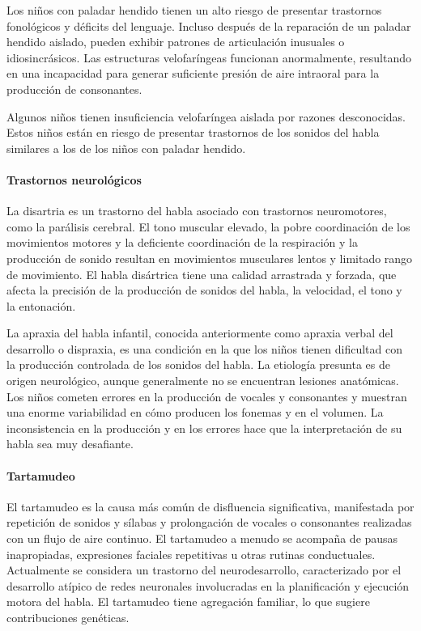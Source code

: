 \documentclass[11pt,letterpaper]{report}
\begin{document}
Los niños con paladar hendido tienen un alto riesgo de presentar trastornos
fonológicos y déficits del lenguaje. Incluso después de la reparación de un
paladar hendido aislado, pueden exhibir patrones de articulación inusuales o
idiosincrásicos. Las estructuras velofaríngeas funcionan anormalmente,
resultando en una incapacidad para generar suficiente presión de aire
intraoral para la producción de consonantes. \cite{Feldman44}

Algunos niños tienen insuficiencia velofaríngea aislada por razones
desconocidas. Estos niños están en riesgo de presentar trastornos de los
sonidos del habla similares a los de los niños con paladar hendido.
\cite{Feldman44}

\paragraph{Trastornos neurológicos}
La disartria es un trastorno del habla asociado con trastornos neuromotores,
como la parálisis cerebral. El tono muscular elevado, la pobre coordinación de
los movimientos motores y la deficiente coordinación de la respiración y la
producción de sonido resultan en movimientos musculares lentos y limitado rango
de movimiento. El habla disártrica tiene una calidad arrastrada y forzada, que
afecta la precisión de la producción de sonidos del habla, la velocidad, el
tono y la entonación. \cite{Feldman44}

La apraxia del habla infantil, conocida anteriormente como apraxia verbal del
desarrollo o dispraxia, es una condición en la que los niños tienen
dificultad con la producción controlada de los sonidos del habla. La etiología
presunta es de origen neurológico, aunque generalmente no se encuentran
lesiones anatómicas. Los niños cometen errores en la producción de vocales y
consonantes y muestran una enorme variabilidad en cómo producen los fonemas y
en el volumen. La inconsistencia en la producción y en los errores hace que la
interpretación de su habla sea muy desafiante. \cite{Feldman44}

\paragraph{Tartamudeo}
El tartamudeo es la causa más común de disfluencia significativa, manifestada
por repetición de sonidos y sílabas y prolongación de vocales o consonantes
realizadas con un flujo de aire continuo. El tartamudeo a menudo se acompaña
de pausas inapropiadas, expresiones faciales repetitivas u otras rutinas
conductuales. Actualmente se considera un trastorno del neurodesarrollo,
caracterizado por el desarrollo atípico de redes neuronales involucradas en la
planificación y ejecución motora del habla. El tartamudeo tiene agregación
familiar, lo que sugiere contribuciones genéticas. \cite{Feldman44}
\end{document}
